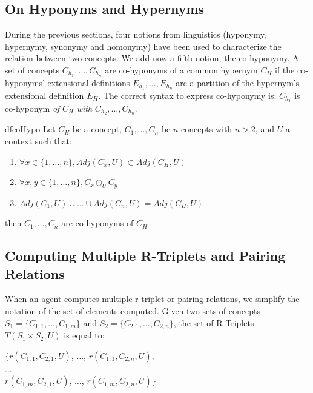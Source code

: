 \subsection{On Hyponyms and Hypernyms}\label{sec:OnHypoHyper}
During the previous sections, four notions from linguistics (hyponymy, hypernymy, synonymy and homonymy) have been used  to characterize the relation between two concepts.  We add now a fifth notion, the co-hyponymy. A set of concepts $C_{h_{1}}, \ldots , C_{h_{n}}$ are co-hyponyms of a common hypernym $C_{H}$ if the co-hyponyms' extensional definitions $E_{h_{1}}, \ldots , E_{h_{n}}$ are a partition  of the hypernym's extensional definition $E_{H}$. The correct syntax to express co-hyponymy is: $C_{h_{1}}$ is co-hyponym \emph{of} $C_{H}$ \emph{with} $C_{h_{2}}, \ldots , C_{h_{n}}$.

\begin{restatable}[Co-Hyponyms]{df}{coHypo}
\label{def:CoHypo}
Let $C_{H}$ be a concept, $C_{1}, \ldots, C_{n}$ be $n$ concepts with $n > 2$, and $U$ a context such that:

\begin{enumerate}
    \item $\forall x \in \{1, \ldots, n\}, Adj(C_{x},U) \subset Adj(C_{H},U)$
    \item $\forall x,y \in \{1, \ldots, n\}, C_{x} \odot_{U} C_{y}$
    \item $Adj(C_{1},U) \cup \ldots \cup Adj(C_{n},U) = Adj(C_{H},U)$
\end{enumerate}

then $C_{1}, \ldots, C_{n}$ are co-hyponyms of $C_{H}$

\end{restatable}

\subsection{Computing Multiple R-Triplets and Pairing Relations}\label{sec:MultipleRelations}

When an agent computes multiple r-triplet or pairing relations, we simplify the notation of the set of elements computed. Given two sets of concepts $S_{1} = \{C_{1,1}, \ldots, C_{1,m} \}$ and $S_{2} = \{C_{2,1}, \ldots, C_{2,n} \}$, the set of R-Triplets $T(S_{1} \times S_{2}, U)$ is equal to:

\begin{center}
    $\{ r(C_{1,1}, C_{2,1}, U)$, $\ldots$, $r(C_{1,1}, C_{2,n}, U)$,\\
    $\ldots$\\
    $r(C_{1,m}, C_{2,1}, U)$, $\ldots$, $r(C_{1,m}, C_{2,n}, U) \}$
\end{center}


